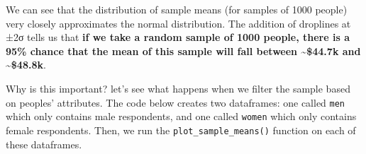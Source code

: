 \documentclass[
  letterpaper,
  DIV=11,
  numbers=noendperiod]{scrreprt}
\newenvironment{Shaded}{\begin{snugshade}}{\end{snugshade}}
\newcommand{\CommentTok}[1]{\textcolor[rgb]{0.37,0.37,0.37}{#1}}
\newcommand{\DecValTok}[1]{\textcolor[rgb]{0.68,0.00,0.00}{#1}}
\newcommand{\NormalTok}[1]{\textcolor[rgb]{0.00,0.23,0.31}{#1}}
\newcommand{\OperatorTok}[1]{\textcolor[rgb]{0.37,0.37,0.37}{#1}}
\newcommand{\StringTok}[1]{\textcolor[rgb]{0.13,0.47,0.30}{#1}}
\begin{document}
We can see that the distribution of sample means (for samples of 1000
people) very closely approximates the normal distribution. The addition
of droplines at ±2σ tells us that \textbf{if we take a random sample of
1000 people, there is a 95\% chance that the mean of this sample will
fall between \textasciitilde\$44.7k and \textasciitilde\$48.8k}.

Why is this important? let's see what happens when we filter the sample
based on peoples' attributes. The code below creates two dataframes: one
called \texttt{men} which only contains male respondents, and one called
\texttt{women} which only contains female respondents. Then, we run the
\texttt{plot\_sample\_means()} function on each of these dataframes.

\begin{Shaded}
\end{Shaded}
\end{document}
